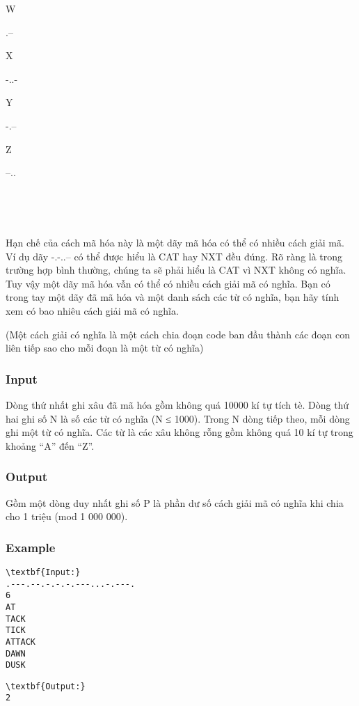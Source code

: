 W

.--

X

-..-

Y

-.--

Z

--..

 

 

Hạn chế của cách mã hóa này là một dãy mã hóa có thể có nhiều cách giải mã. Ví dụ dãy -.-..-- có thể được hiểu là CAT hay NXT đều đúng. Rõ ràng là trong trường hợp bình thường, chúng ta sẽ phải hiểu là CAT vì NXT không có nghĩa. Tuy vậy một dãy mã hóa vẫn có thể có nhiều cách giải mã có nghĩa. Bạn có trong tay một dãy đã mã hóa và một danh sách các từ có nghĩa, bạn hãy tính xem có bao nhiêu cách giải mã có nghĩa.

(Một cách giải có nghĩa là một cách chia đoạn code ban đầu thành các đoạn con liên tiếp sao cho mỗi đoạn là một từ có nghĩa)

\subsubsection{Input}

Dòng thứ nhất ghi xâu đã mã hóa gồm không quá 10000 kí tự tích tè. Dòng thứ hai ghi số N là số các từ có nghĩa (N ≤ 1000). Trong N dòng tiếp theo, mỗi dòng ghi một từ có nghĩa. Các từ là các xâu không rỗng gồm không quá 10 kí tự trong khoảng “A” đến “Z”.

\subsubsection{Output}

Gồm một dòng duy nhất ghi số P là phần dư số cách giải mã có nghĩa khi chia cho 1 triệu (mod 1 000 000).

\subsubsection{Example}
\begin{verbatim}
\textbf{Input:}
.---.--.-.-.-.---...-.---.
6
AT
TACK
TICK
ATTACK
DAWN
DUSK \end{verbatim}
\begin{verbatim}
\textbf{Output:}
2
\end{verbatim}
